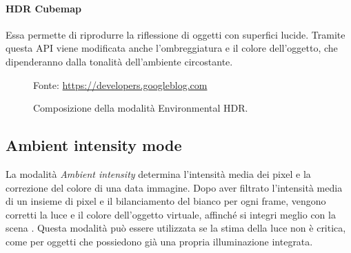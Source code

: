\documentclass[crop=false, class=book]{standalone}
\begin{document}
	
		\paragraph*{HDR Cubemap}
			Essa permette di riprodurre la riflessione di oggetti con superfici lucide. Tramite questa API viene modificata anche l'ombreggiatura e il colore dell'oggetto, che dipenderanno dalla tonalità dell'ambiente circostante.
	
		\begin{figure}
			\centering
			{Fonte: \url{https://developers.googleblog.com}}
			\caption{Composizione della modalità Environmental HDR.}
			\label{fig:env_HDR}
		\end{figure}
	
	\subsection*{Ambient intensity mode}
		La modalità \textit{Ambient intensity} determina l'intensità media dei pixel e la correzione del colore di una data immagine. Dopo aver filtrato l'intensità media di un insieme di pixel e il bilanciamento del bianco per ogni frame, vengono corretti la luce e il colore dell'oggetto virtuale, affinché si integri meglio con la scena \cite{suonsivu2020rgbd}. Questa modalità può essere utilizzata se la stima della luce non è critica, come per oggetti che possiedono già una propria illuminazione integrata.
	
	
\end{document}
